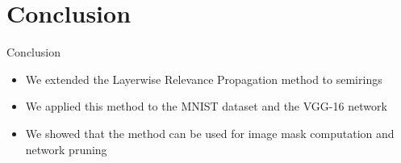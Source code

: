 \documentclass[aspectratio=169]{beamer}
\theoremstyle{definition}
\begin{document}
\section*{Conclusion}
\begin{frame}{Conclusion}
    \begin{itemize}[label=\textbullet]
        \item We extended the Layerwise Relevance Propagation method to semirings
        \item We applied this method to the MNIST dataset and the VGG-16 network
        \item We showed that the method can be used for image mask computation and network pruning
    \end{itemize}
\end{frame}


\begin{frame}[allowframebreaks]
    \nocite{*}
    \printbibliography
\end{frame}
\end{document}
